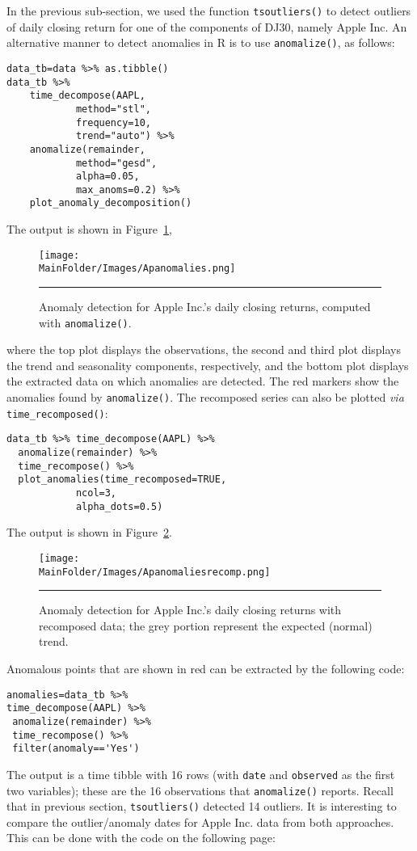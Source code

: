 \begin{Example} In the previous sub-section, we used the function \verb|tsoutliers()| to detect outliers of daily closing return for one of the components of DJ30, namely Apple Inc. An alternative manner to detect anomalies in R is to use \verb+anomalize()+, as follows: 
\begin{lstlisting}
data_tb=data %>% as.tibble()
data_tb %>% 
    time_decompose(AAPL,
            method="stl",
            frequency=10,
            trend="auto") %>%
    anomalize(remainder,
            method="gesd",
            alpha=0.05,
            max_anoms=0.2) %>%
    plot_anomaly_decomposition()
\end{lstlisting}
The output is shown in Figure~\ref{fig:apanomalies},
\begin{figure}[t]
\centering
\texttt{[image: \\MainFolder/Images/Apanomalies.png]}
\caption{\small Anomaly detection for Apple Inc.'s daily closing returns, computed with  \texttt{anomalize()}.}\label{fig:apanomalies}
\hrule
 \end{figure}
where the top plot displays the observations, the second and third plot displays the trend and seasonality components, respectively, and the bottom plot displays the extracted data on which anomalies are detected. The red markers show  the anomalies found by \verb|anomalize()|. The recomposed series can also be plotted \textit{via} \verb|time_recomposed()|:
\begin{lstlisting}
data_tb %>% time_decompose(AAPL) %>% 
  anomalize(remainder) %>% 
  time_recompose() %>%  
  plot_anomalies(time_recomposed=TRUE,
            ncol=3,
            alpha_dots=0.5)
\end{lstlisting}
The output is shown in Figure~\ref{fig:apanomaliesrecomp}.
\begin{figure}[t]
\centering
\texttt{[image: \\MainFolder/Images/Apanomaliesrecomp.png]}
\caption{\small Anomaly detection for Apple Inc.'s daily closing returns with recomposed data; the grey portion represent the expected (normal) trend.}
\hrule\label{fig:apanomaliesrecomp}
\end{figure}
Anomalous points that are shown in red can be extracted by the following code:
\begin{lstlisting}
anomalies=data_tb %>%  
time_decompose(AAPL) %>%  
 anomalize(remainder) %>%  
 time_recompose() %>%  
 filter(anomaly=='Yes')
\end{lstlisting}
The output is a time tibble with 16 rows (with \verb|date| and \verb|observed| as the first two variables); these are the 16 observations that \verb|anomalize()| reports. Recall that in previous section, \verb|tsoutliers()| detected 14 outliers. \newl It is interesting to compare the outlier/anomaly dates for Apple Inc. data from both approaches. This can be done with the code on the following page:

\end{Example}
